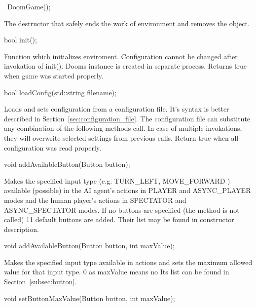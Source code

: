 \vspace{20pt}
\begin{clinee}
~DoomGame();
\end{clinee}

The destructor that safely ends the work of environment and removes the object.


\vspace{20pt}
\begin{clinee}
bool init();
\end{clinee}

Function which initializes enviroment. Configuration cannot be changed after invokation of init(). Dooms instance is created in separate process. Returns true when game was started properly. 


\vspace{20pt}
\begin{clinee}
bool loadConfig(std::string filename);
\end{clinee}

Loads and sets configuration from a configuration file. It's syntax is better described in Section~\ref{sec:configuration_file}. The configuration file can substitute any combination of the following methods call. In case of multiple invokations, they will overwrite selected settings from previous calls. Return true when all configuration was read properly.


\vspace{20pt}
\begin{clinee}
void addAvailableButton(Button button);
\end{clinee}

Makes the specified input type (e.g. TURN\_LEFT, MOVE\_FORWARD ) available (possible) in the AI agent's actions in PLAYER and ASYNC\_PLAYER modes and the human player's actions in SPECTATOR and ASYNC\_SPECTATOR modes. If no buttons are specified (the method is not called) 11 default buttons are added. Their list may be found in constructor description.


\vspace{20pt}
\begin{clinee}
void addAvailableButton(Button button, int maxValue);
\end{clinee}

Makes the specified input type available in actions and sets the maximum allowed value for that input type. 0 as maxValue means no  Its list can be found in Section~\ref{subsec:button}.


\vspace{20pt}
\begin{clinee}
void setButtonMaxValue(Button button, int maxValue);
\end{clinee}

